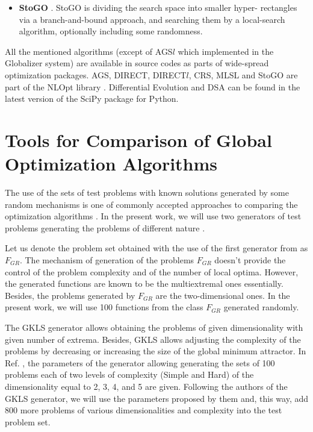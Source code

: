 \documentclass{svproc}
\begin{document}
\begin{itemize}
  \item \textbf{StoGO} \cite{Madsen1998}. StoGO is dividing the search space into smaller hyper-
rectangles via a branch-and-bound approach,
  and searching them by a local-search algorithm, optionally including some randomness.

\end{itemize}

All the mentioned algorithms (except of AGS\(l\) which implemented in the Globalizer system)
are available in source codes as parts of wide-spread optimization packages.
AGS, DIRECT, DIRECT$l$, CRS, MLSL and StoGO are part of the NLOpt library \cite{nlopt}.
Differential Evolution and DSA can be found in
the latest version of the SciPy \cite{scipy} package for Python.

\section{Tools for Comparison of Global Optimization Algorithms}


The use of the sets of test problems with known solutions generated by some random mechanisms is
one of commonly accepted approaches to comparing the optimization algorithms
\cite{Beiranvand2017}. In the present work, we will use two generators of test problems generating
the problems of different nature \cite{grishaginClass, Gaviano2003}.

Let us denote the problem set obtained with the use of the first generator from \cite{grishaginClass}
as \(F_{GR}\). The mechanism of generation of the problems \(F_{GR}\) doesn't provide the
control of the problem complexity and of the number of local optima. However, the generated
functions are known to be the multiextremal ones essentially. Besides, the problems generated by
\(F_{GR}\) are the two-dimensional ones. In the present work, we will use 100 functions from the
class \(F_{GR}\) generated randomly.

The GKLS generator \cite{Gaviano2003} allows obtaining the problems of given dimensionality
with given number of extrema. Besides, GKLS allows adjusting the complexity of the problems by
decreasing or increasing the size of the global minimum attractor. In Ref.
\cite{SergeyevKvasov2006}, the parameters of the generator allowing generating the sets of 100
problems each of two levels of complexity (Simple and Hard) of the dimensionality equal to 2, 3, 4,
and 5 are given. Following the authors of the GKLS generator, we will use the parameters proposed
by them and, this way, add 800 more problems of various dimensionalities and complexity into the
test problem set.
\end{document}
